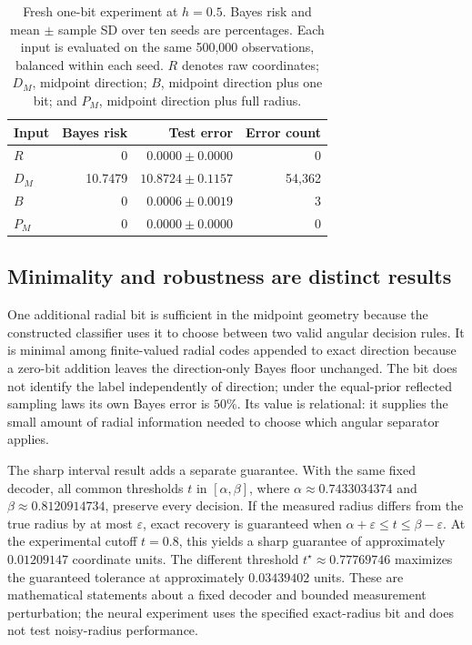 \documentclass[12pt,a4paper]{article}
\begin{document}
\begin{table}[!htbp]
\centering\small
\setlength{\tabcolsep}{3pt}
\caption{Fresh one-bit experiment at $h=0.5$. Bayes risk and mean $\pm$ sample SD over ten seeds are percentages. Each input is evaluated on the same 500,000 observations, balanced within each seed. $R$ denotes raw coordinates; $D_M$, midpoint direction; $B$, midpoint direction plus one bit; and $P_M$, midpoint direction plus full radius.}
\label{tab:one-bit-neural}
\begin{tabular}{lrrr}
\toprule
Input & Bayes risk & Test error & Error count \\
\midrule
$R$ & 0 & $0.0000\pm0.0000$ & 0 \\
$D_M$ & 10.7479 & $10.8724\pm0.1157$ & 54,362 \\
$B$ & 0 & $0.0006\pm0.0019$ & 3 \\
$P_M$ & 0 & $0.0000\pm0.0000$ & 0 \\
\bottomrule
\end{tabular}
\end{table}

\subsection{Minimality and robustness are distinct results}
One additional radial bit is sufficient in the midpoint geometry because the constructed classifier uses it to choose between two valid angular decision rules. It is minimal among finite-valued radial codes appended to exact direction because a zero-bit addition leaves the direction-only Bayes floor unchanged. The bit does not identify the label independently of direction; under the equal-prior reflected sampling laws its own Bayes error is \(50\%\). Its value is relational: it supplies the small amount of radial information needed to choose which angular separator applies.

The sharp interval result adds a separate guarantee. With the same fixed decoder, all common thresholds \(t\) in \([\alpha,\beta]\), where \(\alpha\approx0.7433034374\) and \(\beta\approx0.8120914734\), preserve every decision. If the measured radius differs from the true radius by at most \(\varepsilon\), exact recovery is guaranteed when \(\alpha+\varepsilon\leq t\leq\beta-\varepsilon\). At the experimental cutoff \(t=0.8\), this yields a sharp guarantee of approximately \(0.01209147\) coordinate units. The different threshold \(t^\star\approx0.77769746\) maximizes the guaranteed tolerance at approximately \(0.03439402\) units. These are mathematical statements about a fixed decoder and bounded measurement perturbation; the neural experiment uses the specified exact-radius bit and does not test noisy-radius performance.
\end{document}
